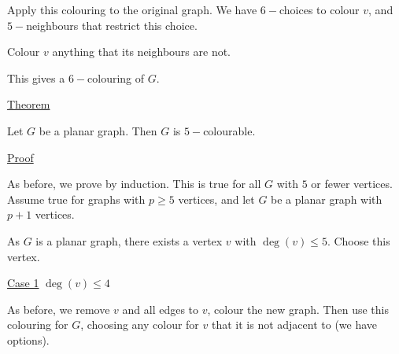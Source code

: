 \documentclass{article}
\begin{document}
Apply this colouring to the original graph. We have $6-$choices to colour $v$, and $5-$neighbours that restrict this choice. 

Colour $v$ anything that its neighbours are not. 

This gives a $6-$colouring of $G$. 

\underline{Theorem}

Let $G$ be a planar graph. Then $G$ is $5-$colourable. 

\underline{Proof}

As before, we prove by induction. This is true for all $G$ with $5$ or fewer vertices. Assume true for graphs with $p \ge 5$ vertices, and let $G$ be a planar graph with $p+1$ vertices. 

As $G$ is a planar graph, there exists a vertex $v$ with $\deg(v) \le 5$. Choose this vertex. 

\underline{Case 1} $\deg(v) \le 4$

As before, we remove $v$ and all edges to $v$, colour the new graph. Then use this colouring for $G$, choosing any colour for $v$ that it is not adjacent to (we have options). 
\end{document}
